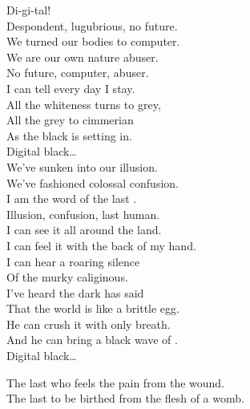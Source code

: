 



Di-gi-tal! \\

Despondent, lugubrious, no future. \\
We turned our bodies to computer. \\
We are our own nature abuser. \\

No future, computer, abuser. \\

I can tell every day I stay. \\
All the whiteness turns to grey, \\
All the grey to cimmerian \\
As the black is setting in. \\

Digital black… \\

We've sunken into our illusion. \\
We've fashioned colossal confusion. \\
I am the word of the last . \\

Illusion, confusion, last human. \\

I can see it all around the land. \\
I can feel it with the back of my hand. \\
I can hear a roaring silence \\
Of the murky caliginous. \\

I've heard the dark  has said \\
That the world is like a brittle egg. \\
He can crush it with only breath. \\
And he can bring a black wave of . \\

Digital black… \\


The last who feels the pain from the wound. \\
The last to be birthed from the flesh of a womb. \\

